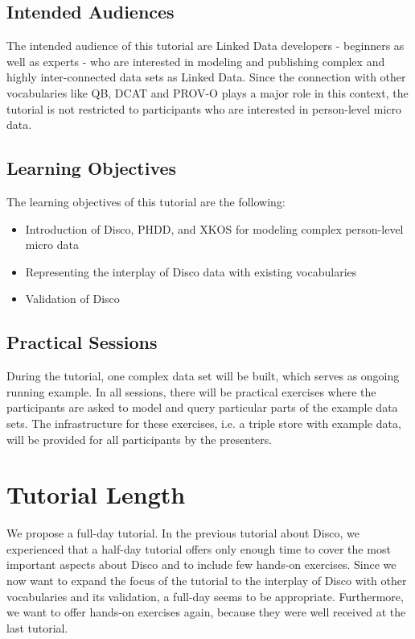 \documentclass{llncs}
\begin{document}
\subsection{Intended Audiences}
The intended audience of this tutorial are Linked Data developers - beginners as well as experts - who are interested in modeling and publishing complex and highly inter-connected data sets as Linked Data. Since the connection with other vocabularies like QB, DCAT and PROV-O plays a major role in this context, the tutorial is not restricted to participants who are interested in person-level micro data.

\subsection{Learning Objectives}
The learning objectives of this tutorial are the following:
\begin{itemize} 
\item Introduction of Disco, PHDD, and XKOS for modeling complex person-level micro data
\item Representing the interplay of Disco data with existing vocabularies
\item Validation of Disco
\end{itemize}

\subsection{Practical Sessions}
During the tutorial, one complex data set will be built, which serves as ongoing running example. In all sessions, there will be practical exercises where the participants are asked to model and query particular parts of the example data sets. The infrastructure for these exercises, i.e. a triple store with example data, will be provided for all participants by the presenters.

\section{Tutorial Length}

We propose a full-day tutorial. In the previous tutorial about Disco, we experienced that a half-day tutorial offers only enough time to cover the most important aspects about Disco and to include few hands-on exercises. Since we now want to expand the focus of the tutorial to the interplay of Disco with other vocabularies and its validation, a full-day seems to be appropriate. Furthermore, we want to offer hands-on exercises again, because they were well received at the last tutorial.
\end{document}
